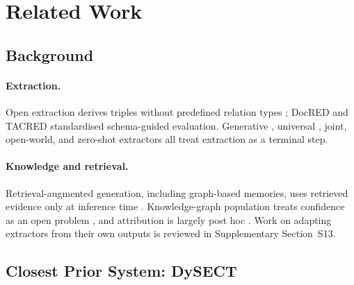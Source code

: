 \documentclass[preprint,12pt,authoryear]{elsarticle}
\begin{document}
\section{Related Work}
\label{sec:related-work}

\subsection{Background}

\paragraph{Extraction.} Open extraction derives triples without
predefined relation types \citep{banko2007openie,liu2024openiesurvey};
DocRED \citep{yao2019docred} and TACRED \citep{zhang2017tacred}
standardised schema-guided evaluation. Generative
\citep{cabot2021rebel,josifoski2022genie,paolini2021tanl}, universal
\citep{lu2022uie,wang2023instructuie}, joint, open-world, and zero-shot
extractors \citep{wadden2019dygiepp,zhang2022oamine,levy2017zeroshot}
all treat extraction as a terminal step.

\paragraph{Knowledge and retrieval.} Retrieval-augmented generation,
including graph-based memories, uses retrieved evidence only at
inference time
\citep{lewis2020rag,guu2020realm,asai2023selfrag,gutierrez2024hipporag,edge2025graphrag}.
Knowledge-graph population treats confidence as an open problem
\citep{bach2017psl,ji2021kgsurvey,nguyen2020kgcsurvey}, and attribution
is largely post hoc \citep{ribeiro2016lime,zhao2023explainability}.
Work on adapting extractors from their own outputs is reviewed in
Supplementary Section~S13.

\subsection{Closest Prior System: DySECT}
\label{sec:related-work-dysect}
\end{document}
